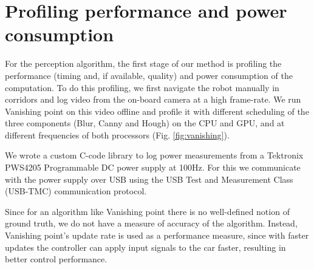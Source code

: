 \section{Profiling performance and power consumption}

For the perception algorithm, the first stage of our method is profiling the performance (timing and, if available, quality) and power consumption of the computation. 
To do this profiling, we first navigate the robot manually in corridors and log video from the on-board camera at a high frame-rate. 
We run Vanishing point on this video offline and profile it with different scheduling of the three components (Blur, Canny and Hough) on the CPU and GPU, and at different frequencies of both processors (Fig. \ref{fig:vanishing}).

We wrote a custom C-code library to log power measurements from a Tektronix PWS4205 Programmable DC power supply at 100Hz. 
For this we communicate with the power supply over USB using the USB Test and Measurement Class (USB-TMC) communication protocol. 

Since for an algorithm like Vanishing point there is no well-defined notion of ground truth, we do not have a measure of accuracy of the algorithm. 
Instead, Vanishing point's update rate is used as a performance measure, since with faster updates the controller can apply input signals to the car faster, resulting in better control performance. 



